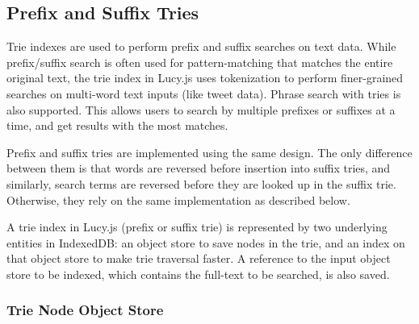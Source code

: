 \documentclass{vldb}
\begin{document}
\subsection{Prefix and Suffix Tries}

Trie indexes are used to perform prefix and suffix searches on text data. While prefix/suffix search is often used for pattern-matching that matches the entire original text, the trie index in Lucy.js uses tokenization to perform finer-grained searches on multi-word text inputs (like tweet data). Phrase search with tries is also supported. This allows users to search by multiple prefixes or suffixes at a time, and get results with the most matches.

Prefix and suffix tries are implemented using the same design. The only difference between them is that words are reversed before insertion into suffix tries, and similarly, search terms are reversed before they are looked up in the suffix trie. Otherwise, they rely on the same implementation as described below.

A trie index in Lucy.js (prefix or suffix trie) is represented by two underlying entities in IndexedDB: an object store to save nodes in the trie, and an index on that object store to make trie traversal faster.  A reference to the input object store to be indexed, which contains the full-text to be searched, is also saved.

\subsubsection{Trie Node Object Store}
\end{document}
